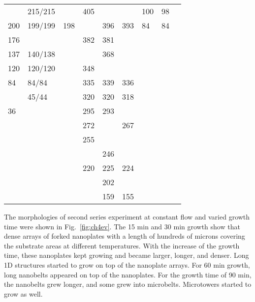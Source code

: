 \begin{landscape}
\begin{table}[htb]
\begin{tabular}{lllllllll}
        & 215/215 &             & 405    &        &             & 100    & 98        &       \\
 200    & 199/199 & 198         &        & 396    & 393         & 84     & 84        &       \\
 176    &         &             & 382    & 381    &             &        &           &       \\
 137    & 140/138 &             &        & 368    &             &        &           &       \\
 120    & 120/120 &             & 348    &        &             &        &           &       \\
 84     & 84/84   &             & 335    & 339    & 336         &        &           &       \\
        & 45/44   &             & 320    & 320    & 318         &        &           &       \\
 36     &         &             & 295    & 293    &             &        &           &       \\
        &         &             & 272    &        & 267         &        &           &       \\
        &         &             & 255    &        &             &        &           &       \\
        &         &             &        & 246    &             &        &           &       \\
        &         &             & 220    & 225    & 224         &        &           &       \\
        &         &             &        & 202    &             &        &           &       \\
        &         &             &        & 159    & 155         &        &           &       \\
\bottomrule
\end{tabular}
\end{table}
\end{landscape}
The morphologies of second series experiment at constant  flow and varied growth time were shown in Fig.~\ref{fig:ch4ev}. The 15 min and 30 min growth show that dense arrays of  forked nanoplates with a length of hundreds of microns covering the substrate areas at different temperatures. With the increase of the growth time, these nanoplates kept growing and became larger, longer, and denser. Long 1D  structures started to grow on top of the nanoplate arrays. For 60 min growth, long nanobelts appeared on top of the nanoplates. For the growth time of 90 min, the nanobelts grew longer, and some grew into microbelts. Microtowers started to grow as well.

